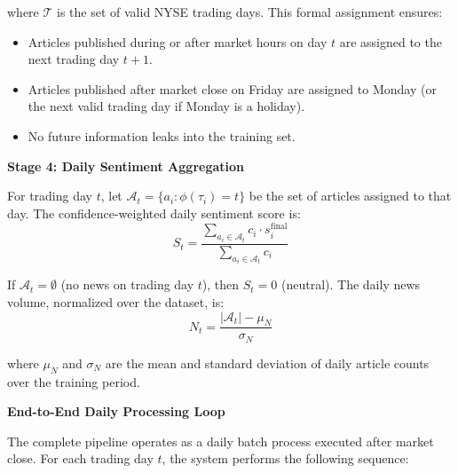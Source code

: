 where $\mathcal{T}$ is the set of valid NYSE trading days. This formal assignment ensures:
\begin{itemize}
    \item Articles published during or after market hours on day $t$ are assigned to the next trading day $t+1$.
    \item Articles published after market close on Friday are assigned to Monday (or the next valid trading day if Monday is a holiday).
    \item No future information leaks into the training set.
\end{itemize}

\textbf{Stage 4: Daily Sentiment Aggregation}

For trading day $t$, let $\mathcal{A}_t = \{a_i : \phi(\tau_i) = t\}$ be the set of articles assigned to that day. The confidence-weighted daily sentiment score is:
\begin{equation}
S_t = \frac{\sum_{a_i \in \mathcal{A}_t} c_i \cdot s_i^{\text{final}}}{\sum_{a_i \in \mathcal{A}_t} c_i}
\end{equation}

If $\mathcal{A}_t = \emptyset$ (no news on trading day $t$), then $S_t = 0$ (neutral). The daily news volume, normalized over the dataset, is:
\begin{equation}
N_t = \frac{|\mathcal{A}_t| - \mu_N}{\sigma_N}
\end{equation}

where $\mu_N$ and $\sigma_N$ are the mean and standard deviation of daily article counts over the training period.

\textbf{End-to-End Daily Processing Loop}

The complete pipeline operates as a daily batch process executed after market close. For each trading day $t$, the system performs the following sequence:


